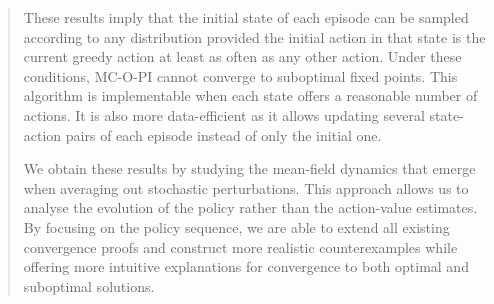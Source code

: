 \begin{abstract}
These results imply that
the initial state of each episode can be sampled according to any distribution
provided the initial action in that state is the current greedy action at least as often as any other action.
Under these conditions, MC-O-PI cannot converge to suboptimal fixed points.
This algorithm is implementable when each state offers a reasonable number of actions.
It is also more data-efficient as it allows updating several state-action pairs of each episode instead of only the initial one.


We obtain these results by studying the mean-field dynamics that emerge when averaging out stochastic perturbations.
This approach allows us to analyse the evolution of the policy rather than the action-value estimates. By focusing on the policy sequence, we are able to extend all existing convergence proofs and construct more realistic counterexamples while offering more intuitive explanations for convergence to both optimal and suboptimal solutions.






\end{abstract}
